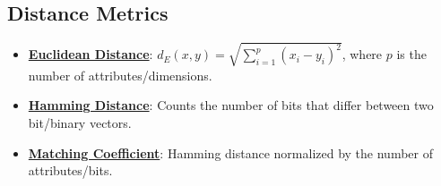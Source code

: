 \documentclass{article}%
\begin{document}
\subsection{Distance Metrics}%
\label{subsec:DistanceMetrics}%
\begin{itemize}[leftmargin=*]%
\item \href{https://purdue.brightspace.com/d2l/common/assets/pdfjs-d2l-dist/1.0.14-legacy/web/viewer.html?file=\%2Fcontent\%2Fenforced\%2F1095467-wl.202510.CS.24300.001\%2F12L2-distance-clusters.pdf\%3Fou\%3D1095467\&lang=en-us\&container=d2l-fileviewer-rendered-pdf\&fullscreen=d2l-fileviewer-rendered-pdf-dialog\&height=667#page=17}{\textbf{Euclidean Distance}}: $d_E(x, y) = \sqrt{\sum_{i=1}^{p} (x_i - y_i)^2}$, where $p$ is the number of attributes/dimensions.%
\item \href{https://purdue.brightspace.com/d2l/common/assets/pdfjs-d2l-dist/1.0.14-legacy/web/viewer.html?file=\%2Fcontent\%2Fenforced\%2F1095467-wl.202510.CS.24300.001\%2F12L2-distance-clusters.pdf\%3Fou\%3D1095467\&lang=en-us\&container=d2l-fileviewer-rendered-pdf\&fullscreen=d2l-fileviewer-rendered-pdf-dialog\&height=667#page=19}{\textbf{Hamming Distance}}: Counts the number of bits that differ between two bit/binary vectors.%
\item \href{https://purdue.brightspace.com/d2l/common/assets/pdfjs-d2l-dist/1.0.14-legacy/web/viewer.html?file=\%2Fcontent\%2Fenforced\%2F1095467-wl.202510.CS.24300.001\%2F12L2-distance-clusters.pdf\%3Fou\%3D1095467\&lang=en-us\&container=d2l-fileviewer-rendered-pdf\&fullscreen=d2l-fileviewer-rendered-pdf-dialog\&height=667#page=19}{\textbf{Matching Coefficient}}: Hamming distance normalized by the number of attributes/bits.%
\end{itemize}

%
\end{document}
